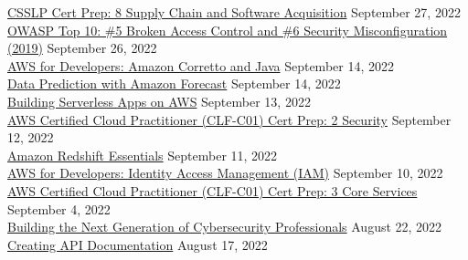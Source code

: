 \documentclass[10pt]{res} %
\begin{document}
\begin{resume}
\href{https://www.linkedin.com/learning/certificates/6685fe2a12ca0cd12b1018e874d49f2756b5fbaef6a42e642ffbb8bf50c6ebf6}{\color{blue}CSSLP Cert Prep: 8 Supply Chain and Software Acquisition} \hfill September 27, 2022 \\
\href{https://www.linkedin.com/learning/certificates/144040f8adb58fb2a4269d341dd073e2e065528d0b6d2f72ccadaa54bcad5b45}{\color{blue}OWASP Top 10: \#5 Broken Access Control and \#6 Security Misconfiguration (2019)} \hfill September 26, 2022 \\
\href{https://www.linkedin.com/learning/certificates/b6b8bc0685e42f2d4d69b67409a491ade94528cbae987f760eda71ad0caf7862}{\color{blue}AWS for Developers: Amazon Corretto and Java} \hfill September 14, 2022 \\
\href{https://www.linkedin.com/learning/certificates/59fe65886651a7de8895fd1deb3643f35bd99904fe418b41c40f2f2c4ad27868}{\color{blue}Data Prediction with Amazon Forecast} \hfill September 14, 2022 \\
\href{https://www.linkedin.com/learning/certificates/730ba5111c85de8d9204edc2730a5f6f127ee56523492196e9c5f0c0f67caa9c}{\color{blue}Building Serverless Apps on AWS} \hfill September 13, 2022 \\
\href{https://www.linkedin.com/learning/certificates/e2e47334785de3bbaeeee110999e68277488a77f9d528897dead7ddffb25580b}{\color{blue}AWS Certified Cloud Practitioner (CLF-C01) Cert Prep: 2 Security} \hfill September 12, 2022 \\
\href{https://www.linkedin.com/learning/certificates/bd3c6dd7d3516d3e1d08ababf6c76acfe4a83193498c8500eaaf2d687f80e226}{\color{blue}Amazon Redshift Essentials} \hfill September 11, 2022 \\
\href{https://www.linkedin.com/learning/certificates/81b5ac3393e393e973f7a69de7d6403d6db2bbce519a99701fd260547bba7b73}{\color{blue}AWS for Developers: Identity Access Management (IAM)} \hfill September 10, 2022 \\
\href{https://www.linkedin.com/learning/certificates/a4557922c9e1dd9b14bd92d881f06cf4e09e904a622bdf605973c7b5f854eae4}{\color{blue}AWS Certified Cloud Practitioner (CLF-C01) Cert Prep: 3 Core Services} \hfill September 4, 2022 \\
\href{https://www.linkedin.com/learning/certificates/74997fb28865c6fbb743e4654655356d5b035b31e709503623ab31c742aa8503}{\color{blue}Building the Next Generation of Cybersecurity Professionals} \hfill August 22, 2022 \\
\href{https://www.linkedin.com/learning/certificates/58d400e5b40214f3c9ab8d17e60decce77813883e1988ebb0e206080c63616c2}{\color{blue}Creating API Documentation} \hfill August 17, 2022 \\

\end{resume}
\end{document}
